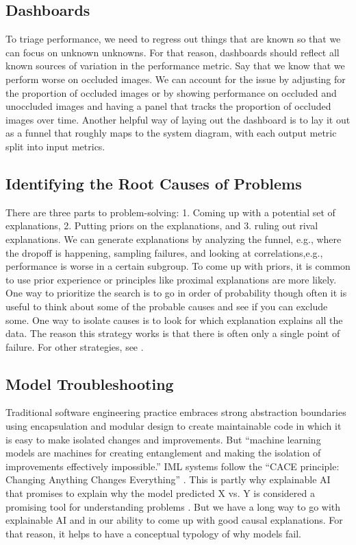 \documentclass[12pt, letterpaper]{article}
\begin{document}
\subsection{Dashboards}

To triage performance, we need to regress out things that are known so that we can focus on unknown unknowns. For that reason, dashboards should reflect all known sources of variation in the performance metric. Say that we know that we perform worse on occluded images. We can account for the issue by adjusting for the proportion of occluded images or by showing performance on occluded and unoccluded images and having a panel that tracks the proportion of occluded images over time. Another helpful way of laying out the dashboard is to lay it out as a funnel that roughly maps to the system diagram, with each output metric split into input metrics. 

\subsection{Identifying the Root Causes of Problems}
There are three parts to problem-solving: 1. Coming up with a potential set of explanations, 2. Putting priors on the explanations, and 3. ruling out rival explanations. We can generate explanations by analyzing the funnel, e.g., where the dropoff is happening, sampling failures, and looking at correlations,e.g., performance is worse in a certain subgroup. To come up with priors, it is common to use prior experience or principles like proximal explanations are more likely. One way to prioritize the search is to go in order of probability though often it is useful to think about some of the probable causes and see if you can exclude some. One way to isolate causes is to look for which explanation explains all the data. The reason this strategy works is that there is often only a single point of failure. For other strategies, see \cite{shroff}.

\subsection{Model Troubleshooting}
Traditional software engineering practice embraces strong abstraction boundaries using encapsulation and modular design to create maintainable code in which it is easy to make isolated changes and improvements. But ``machine learning models are machines for creating entanglement and making the isolation of improvements effectively impossible.'' IML systems follow the ``CACE principle: Changing Anything Changes Everything'' \citep{sculley2015hidden}. This is partly why explainable AI that promises to explain why the model predicted X vs. Y is considered a promising tool for understanding problems \citep{duckworth}. But we have a long way to go with explainable AI and in our ability to come up with good causal explanations. For that reason, it helps to have a conceptual typology of why models fail.
\end{document}

